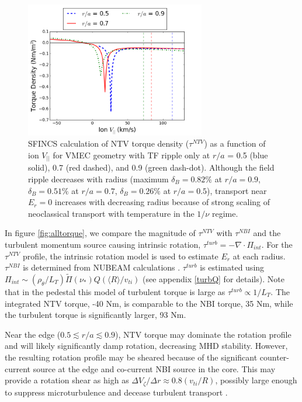 \documentclass{article}
\numberwithin{figure}{section}
\numberwithin{equation}{section}
\begin{document}
\begin{figure}[h!]
\centering
\includegraphics[width=0.7\textwidth]
{Torque_radiusscaling.png}
\caption{\label{fig:Torque_radiusscaling} SFINCS calculation of NTV torque density ($\tau^{NTV}$) as a function of ion $V_{||}$ for VMEC geometry with TF ripple only at $r/a$ = 0.5 (blue solid), 0.7 (red dashed), and 0.9 (green dash-dot). Although the field ripple decreases with radius (maximum $\delta_B = 0.82\%$ at $r/a = 0.9$, $\delta_B = 0.51\%$ at $r/a = 0.7$, $\delta_B = 0.26\%$ at $r/a = 0.5$), transport near $E_r = 0$ increases with decreasing radius because of strong scaling of neoclassical transport with temperature in the $1/\nu$ regime.}
\end{figure}

In figure \ref{fig:alltorque}, we compare the magnitude of $\tau^{NTV}$ with $\tau^{NBI}$ and the turbulent momentum source causing intrinsic rotation, $\tau^{turb} = -\nabla \cdot \Pi_{int}$. For the $\tau^{NTV}$ profile, the intrinsic rotation model is used to estimate $E_r$ at each radius. $\tau^{NBI}$ is determined from NUBEAM calculations \cite{Poli2014}. $\tau^{turb}$ is estimated using $\Pi_{int} \sim (\rho_{\theta}/L_T) \widetilde{\Pi}(\nu_*) Q (\langle R \rangle/v_{ti})$ (see appendix \ref{turbQ} for details). Note that in the pedestal this model of turbulent torque is large as $\tau^{turb} \propto 1/L_T$. The integrated NTV torque, -40 Nm, is comparable to the NBI torque, 35 Nm, while the turbulent torque is significantly larger, 93 Nm. 

Near the edge ($0.5 \lesssim r/a \lesssim 0.9$), NTV torque may dominate the rotation profile and will likely significantly damp rotation, decreasing MHD stability. However, the resulting rotation profile may be sheared because of the significant counter-current source at the edge and co-current NBI source in the core. This may provide a rotation shear as high as $\Delta V_{\zeta}/ \Delta r \approx 0.8 (v_{ti}/R)$, possibly large enough to suppress microturbulence and decease turbulent transport \cite{Hahm1994}. 
\end{document}
